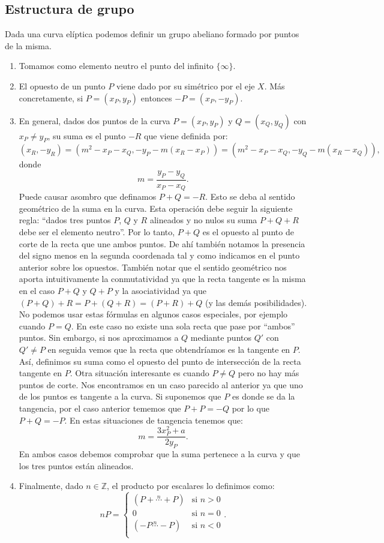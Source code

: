 \documentclass[11pt]{article}
\begin{document}
\subsection{Estructura de grupo}
Dada una curva elíptica podemos definir un grupo abeliano formado por puntos de la misma. 
\begin{enumerate}
\item Tomamos como elemento neutro el punto del infinito $ \{\infty\} $.
\item El opuesto de un punto $ P $ viene dado por su simétrico por el eje $ X $. Más concretamente, si $ P = (x_P, y_P) $ entonces $ -P = (x_P, -y_P) $.
\item En general, dados dos puntos de la curva $ P = (x_P, y_P) $ y $ Q = (x_Q, y_Q) $ con $ x_P \neq y_P $, su suma es el punto $ -R $ que viene definida por:
\[
(x_R, -y_R) =(m^2 − x_P − x_Q, -y_P - m(x_R − x_P )) = (m^2 − x_P − x_Q, -y_Q - m(x_R − x_Q )),
\]
donde
\[
m = \frac{y_P-y_Q}{x_P-x_Q}.
\]
Puede causar asombro que definamos $ P+Q=-R $. Esto se deba al sentido geométrico de la suma en la curva. Esta operación debe seguir la siguiente regla: ``dados tres puntos $ P$, $ Q $ y $ R $ alineados y no nulos su suma $ P + Q + R $ debe ser el elemento neutro''. Por lo tanto, $ P +Q $ es el opuesto al punto de corte de la recta que une ambos puntos. De ahí también notamos la presencia del signo menos en la segunda coordenada tal y como indicamos en el punto anterior sobre los opuestos. También notar que el sentido geométrico nos aporta intuitivamente la conmutatividad ya que la recta tangente es la misma en el caso $ P+Q $ y $ Q+P $ y la asociatividad ya que $ (P+Q) + R = P + (Q+R) = (P+R) + Q$ (y las demás posibilidades).\\

No podemos usar estas fórmulas en algunos casos especiales, por ejemplo cuando $ P=Q $. En este caso no existe una sola recta que pase por ``ambos'' puntos. Sin embargo, si nos aproximamos a $ Q $ mediante puntos $ Q' $ con $ Q' \neq P $ en seguida vemos que la recta que obtendríamos es la tangente en $ P $. Así, definimos su suma como el opuesto del punto de intersección de la recta tangente en $ P $. Otra situación interesante es cuando $ P \neq Q $ pero no hay más puntos de corte. Nos encontramos en un caso parecido al anterior ya que uno de los puntos es tangente a la curva. Si suponemos que $ P $ es donde se da la tangencia, por el caso anterior tememos que $ P + P = -Q $ por lo que $ P + Q = -P $. En estas situaciones de tangencia tenemos que:
\[
m = \frac{3x^{2}_P + a}{2y_P}.
\]
En ambos casos debemos comprobar que la suma pertenece a la curva y que los tres puntos están alineados.

\item Finalmente, dado $ n \in \mathbb{Z} $, el producto por escalares lo definimos como:
\[   
nP = 
\begin{cases}
 (P+\stackrel{n}{\cdots}+P) &\text{si } n > 0\\
0 &\text{si } n = 0\\
(-P\stackrel{n}{\cdots}-P) &\text{si } n < 0\\
\end{cases}.
\]
\end{enumerate}
\end{document}
